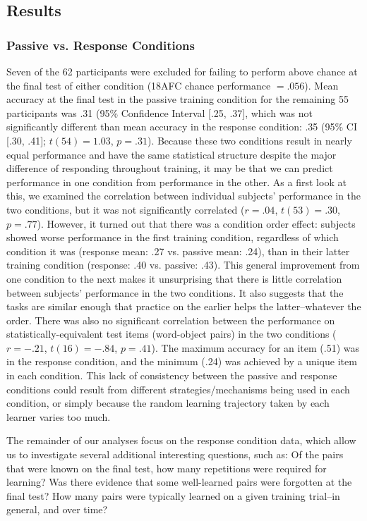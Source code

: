 \documentclass[man,floatsintext]{apa6}
\begin{document}
\subsection{Results}

\subsubsection{Passive vs. Response Conditions}

Seven of the 62 participants were excluded for failing to perform above chance at the final test of either condition (18AFC chance performance $= .056$). Mean accuracy at the final test in the passive training condition for the remaining 55 participants was .31 (95\% Confidence Interval [.25, .37], which was not significantly different than mean accuracy in the response condition: .35 (95\% CI [.30, .41]; $t(54) = 1.03$, $p=.31$). Because these two conditions result in nearly equal performance and have the same statistical structure despite the major difference of responding throughout training, it may be that we can predict performance in one condition from performance in the other. As a first look at this, we examined the correlation between individual subjects' performance in the two conditions, but it was not significantly correlated ($r = .04$, $t(53)=.30$, $p=.77$). However, it turned out that there was a condition order effect: subjects showed worse performance in the first training condition, regardless of which condition it was (response mean: .27 vs. passive mean: .24), than in their latter training condition (response: .40 vs. passive: .43). This general improvement from one condition to the next makes it unsurprising that there is little correlation between subjects' performance in the two conditions. It also suggests that the tasks are similar enough that practice on the earlier helps the latter--whatever the order. There was also no significant correlation between the performance on statistically-equivalent test items (word-object pairs) in the two conditions ($r = -.21$, $t(16)=-.84$, $p=.41$). The maximum accuracy for an item (.51) was in the response condition, and the minimum (.24) was achieved by a unique item in each condition. This lack of consistency between the passive and response conditions could result from different strategies/mechanisms being used in each condition, or simply because the random learning trajectory taken by each learner varies too much.

The remainder of our analyses focus on the response condition data, which allow us to investigate several additional interesting questions, such as: Of the pairs that were known on the final test, how many repetitions were required for learning? Was there evidence that some well-learned pairs were forgotten at the final test? How many pairs were typically learned on a given training trial--in general, and over time? 
\end{document}
